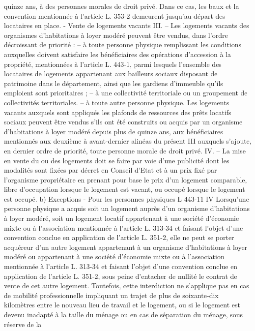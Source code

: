 \documentclass[11pt,a4paper]{report}
\begin{document}
	quinze ans, à des personnes morales de droit privé. Dans ce cas, les baux et la convention mentionnée à l'article
	L. 353-2 demeurent jusqu'au départ des locataires en place.
	- Vente de logements vacants
	III. – Les logements vacants des organismes d'habitations à loyer modéré peuvent être vendus, dans l'ordre
	décroissant de priorité :
	– à toute personne physique remplissant les conditions auxquelles doivent satisfaire les bénéficiaires des
	opérations d'accession à la propriété, mentionnées à l'article L. 443-1, parmi lesquels l'ensemble des locataires
	de logements appartenant aux bailleurs sociaux disposant de patrimoine dans le département, ainsi que les
	gardiens d'immeuble qu'ils emploient sont prioritaires ;
	– à une collectivité territoriale ou un groupement de collectivités territoriales.
	– à toute autre personne physique.
	Les logements vacants auxquels sont appliqués les plafonds de ressources des prêts locatifs sociaux peuvent être
	vendus s'ils ont été construits ou acquis par un organisme d'habitations à loyer modéré depuis plus de quinze
	ans, aux bénéficiaires mentionnés aux deuxième à avant-dernier alinéas du présent III auxquels s'ajoute, en
	dernier ordre de priorité, toute personne morale de droit privé.
	IV. – La mise en vente du ou des logements doit se faire par voie d'une publicité dont les modalités sont fixées
	par décret en Conseil d'Etat et à un prix fixé par l'organisme propriétaire en prenant pour base le prix d'un
	logement comparable, libre d'occupation lorsque le logement est vacant, ou occupé lorsque le logement est
	occupé.
	b) Exceptions
	- Pour les personnes physiques
	L 443-11 IV Lorsqu'une personne physique a acquis soit un logement auprès d'un organisme d'habitations à
	loyer modéré, soit un logement locatif appartenant à une société d'économie mixte ou à l'association mentionnée
	à l'article L. 313-34 et faisant l'objet d'une convention conclue en application de l'article L. 351-2, elle ne peut
	se porter acquéreur d'un autre logement appartenant à un organisme d'habitations à loyer modéré ou
	appartenant à une société d'économie mixte ou à l'association mentionnée à l'article L. 313-34 et faisant l'objet
	d'une convention conclue en application de l'article L. 351-2, sous peine d'entacher de nullité le contrat de vente
	de cet autre logement. Toutefois, cette interdiction ne s'applique pas en cas de mobilité professionnelle
	impliquant un trajet de plus de soixante-dix kilomètres entre le nouveau lieu de travail et le logement, ou si le
	logement est devenu inadapté à la taille du ménage ou en cas de séparation du ménage, sous réserve de la
\end{document}
